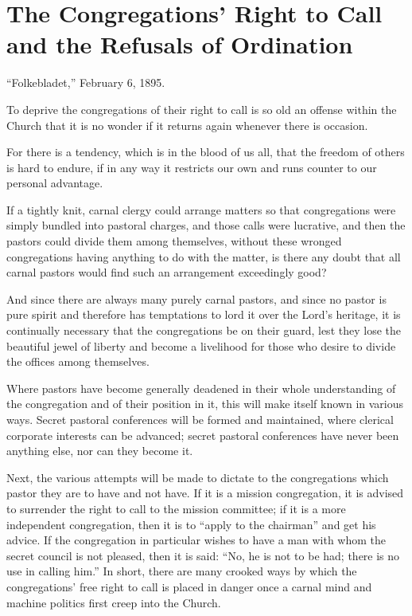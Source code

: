 
\section{The Congregations’ Right to Call and the Refusals of Ordination}

“Folkebladet,” February 6, 1895.

To deprive the congregations of their right to call is so old an offense within the Church that it is no wonder if it returns again whenever there is occasion.

For there is a tendency, which is in the blood of us all, that the freedom of others is hard to endure, if in any way it restricts our own and runs counter to our personal advantage.

If a tightly knit, carnal clergy could arrange matters so that congregations were simply bundled into pastoral charges, and those calls were lucrative, and then the pastors could divide them among themselves, without these wronged congregations having anything to do with the matter, is there any doubt that all carnal pastors would find such an arrangement exceedingly good?

And since there are always many purely carnal pastors, and since no pastor is pure spirit and therefore has temptations to lord it over the Lord’s heritage, it is continually necessary that the congregations be on their guard, lest they lose the beautiful jewel of liberty and become a livelihood for those who desire to divide the offices among themselves.

Where pastors have become generally deadened in their whole understanding of the congregation and of their position in it, this will make itself known in various ways. Secret pastoral conferences will be formed and maintained, where clerical corporate interests can be advanced; secret pastoral conferences have never been anything else, nor can they become it.

Next, the various attempts will be made to dictate to the congregations which pastor they are to have and not have. If it is a mission congregation, it is advised to surrender the right to call to the mission committee; if it is a more independent congregation, then it is to “apply to the chairman” and get his advice. If the congregation in particular wishes to have a man with whom the secret council is not pleased, then it is said: “No, he is not to be had; there is no use in calling him.” In short, there are many crooked ways by which the congregations’ free right to call is placed in danger once a carnal mind and machine politics first creep into the Church.

